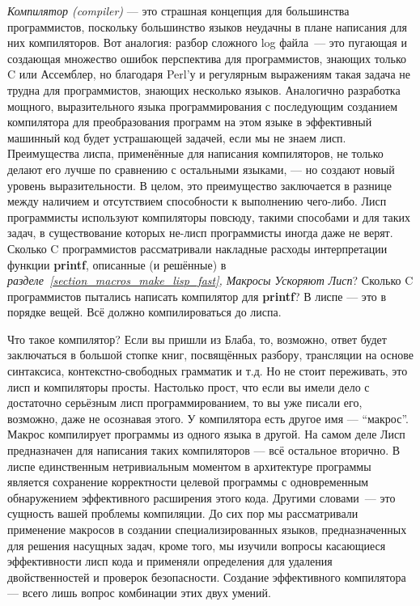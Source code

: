 \emph{Компилятор (compiler)} --- это страшная концепция для большинства программистов, поскольку большинство языков неудачны в плане написания для них компиляторов. Вот аналогия: разбор сложного log файла~--- это пугающая и создающая множество ошибок перспектива для программистов, знающих только C или Ассемблер, но благодаря Perl'у и регулярным выражениям такая задача не трудна для программистов, знающих несколько языков. Аналогично разработка мощного, выразительного языка программирования с последующим созданием компилятора для преобразования программ на этом языке в эффективный машинный код будет устрашающей задачей, если мы не знаем лисп. Преимущества лиспа, применённые для написания компиляторов, не только делают его лучше по сравнению с остальными языками, --- но создают новый уровень выразительности. В целом, это преимущество заключается в разнице между наличием и отсутствием способности к выполнению чего-либо. Лисп программисты используют компиляторы повсюду, такими способами и для таких задач, в существование которых не-лисп программисты иногда даже не верят. Сколько C программистов рассматривали накладные расходы интерпретации функции \textbf{printf}, описанные (и решённые) в \emph{разделе~\ref{section_macros_make_lisp_fast}, Макросы Ускоряют Лисп}? Сколько C программистов пытались написать компилятор для \textbf{printf}? В лиспе --- это в порядке вещей. Всё должно компилироваться до лиспа.

Что такое компилятор? Если вы пришли из Блаба, то, возможно, ответ будет заключаться в большой стопке книг, посвящённых разбору, трансляции на основе синтаксиса, контекстно-свободных грамматик и т.д. Но не стоит переживать, это лисп и компиляторы просты. Настолько прост, что если вы имели дело с достаточно серьёзным лисп программированием, то вы уже писали его, возможно, даже не осознавая этого. У компилятора есть другое имя --- ``макрос''. Макрос компилирует программы из одного языка в другой. На самом деле Лисп предназначен для написания таких компиляторов --- всё остальное вторично. В лиспе единственным нетривиальным моментом в архитектуре программы является сохранение корректности целевой программы с одновременным обнаружением эффективного расширения этого кода. Другими словами~--- это сущность вашей проблемы компиляции. До сих пор мы рассматривали применение макросов в создании специализированных языков, предназначенных для решения насущных задач, кроме того, мы изучили вопросы касающиеся эффективности лисп кода и применяли определения для удаления двойственностей и проверок безопасности. Создание эффективного компилятора --- всего лишь вопрос комбинации этих двух умений.

